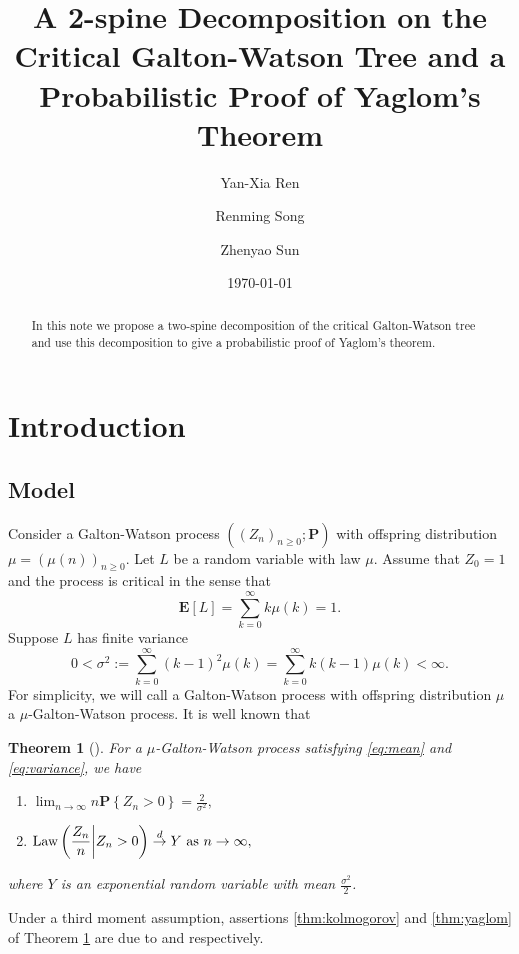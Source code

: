 \documentclass[12pt]{amsart}
\title[A 2-spine decomposition and Yaglom's theorem]{\large A 2-spine Decomposition on the Critical Galton-Watson Tree and a Probabilistic Proof of Yaglom's Theorem}
\author{Yan-Xia Ren}
\author{Renming Song}
\author{Zhenyao Sun}
\date{\today}
\newtheorem{thm}{Theorem}[section]
\numberwithin{equation}{section}
\newcommand{\expr}[1]{\left( #1 \right)}
\newcommand{\set}[1]{\left\{ #1 \right\}}
\newcommand{\law}{\text{\rm Law}}
\newcommand{\tolaw}{\stackrel{d}{\to}}
\newcommand{\expct}{\mathbf E}
\newcommand{\bP}{\mathbf P}\newcommand{\bbP}{\mathbb P}\newcommand{\cP}{\mathcal P}
\begin{document}
\begin{abstract}
	In this note  we propose a two-spine decomposition of the critical
		Galton-Watson
	tree and use this decomposition to give a probabilistic proof of Yaglom's theorem.
\end{abstract}
	\maketitle	
\section{Introduction}
\subsection{Model}
\label{sec:model}
	Consider a Galton-Watson process $((Z_n)_{n\ge0}; \bP )$ with offspring distribution $\mu=(\mu(n))_{n\ge 0}$.
	Let $L$ be a random variable with law $\mu$. Assume that $Z_0=1$ and the process is critical in the sense that
\begin{equation}
\label{eq:mean}
		\expct [L]
	=
		\sum_{k=0}^\infty k \mu(k)
	=
		1.
\end{equation}
	Suppose $L$ has finite variance
\begin{equation}
\label{eq:variance}
		0	
	<	
		\sigma^2
	:=
		\sum_{k=0}^\infty  (k-1)^2 \mu(k)
	=
		\sum_{k=0}^\infty k(k-1) \mu(k)
	<
		\infty.
\end{equation}
For simplicity, we will call a Galton-Watson process with offspring distribution $\mu$
a $\mu$-Galton-Watson process.
	It is well known that
\begin{thm}[\cite{kesten1966galton}]
\label{thm:kesten}
For a $\mu$-Galton-Watson process satisfying \eqref{eq:mean} and \eqref{eq:variance}, we have
\begin{enumerate}
\item
\label{thm:kolmogorov}
	$\displaystyle \lim_{n \to \infty} n \bP \set{Z_n>0} = \frac{2}{\sigma^2},$ %
\item
\label{thm:yaglom}
	$\displaystyle	\law\expr{\frac{Z_n}{n}\bigg| Z_n>0}\tolaw Y \ \text{as }n\to\infty,$
\end{enumerate}
	where $Y$ is an exponential random variable with mean $\frac{\sigma^2}{2}$.
\end{thm}
\par
	Under a third moment assumption, assertions \eqref{thm:kolmogorov} and \eqref{thm:yaglom} of Theorem \ref{thm:kesten} are due to \cite{kolmogorov1938losung} and \cite{yaglom1947certain} respectively.
\end{document}
